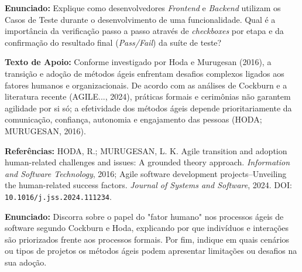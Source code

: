 \documentclass[12pt]{article}
\begin{document}
\vspace{0.15cm}
\noindent\textbf{Enunciado:} Explique como desenvolvedores \textit{Frontend} e \textit{Backend} utilizam os Casos de Teste durante o desenvolvimento de uma funcionalidade. Qual é a importância da verificação passo a passo através de \textit{checkboxes} por etapa e da confirmação do resultado final (\textit{Pass/Fail}) da suíte de teste?

\vspace{0.2cm}
\begin{caixaResposta}
\end{caixaResposta}

\vspace{0.6cm}

\vspace{0.15cm}

\begin{textoApoio}
\small
\textbf{Texto de Apoio:} Conforme investigado por Hoda e Murugesan (2016), a transição e adoção de métodos ágeis enfrentam desafios complexos ligados aos fatores humanos e organizacionais. De acordo com as análises de Cockburn e a literatura recente (AGILE..., 2024), práticas formais e cerimônias não garantem agilidade por si só; a efetividade dos métodos ágeis depende prioritariamente da comunicação, confiança, autonomia e engajamento das pessoas (HODA; MURUGESAN, 2016).

\vspace{0.15cm}
\noindent\textbf{Referências:} HODA, R.; MURUGESAN, L. K. Agile transition and adoption human-related challenges and issues: A grounded theory approach. \textit{Information and Software Technology}, 2016; Agile software development projects--Unveiling the human-related success factors. \textit{Journal of Systems and Software}, 2024. DOI: \texttt{10.1016/j.jss.2024.111234}.
\end{textoApoio}

\vspace{0.15cm}
\noindent\textbf{Enunciado:} Discorra sobre o papel do "fator humano" nos processos ágeis de software segundo Cockburn e Hoda, explicando por que indivíduos e interações são priorizados frente aos processos formais. Por fim, indique em quais cenários ou tipos de projetos os métodos ágeis podem apresentar limitações ou desafios na sua adoção.
\end{document}
